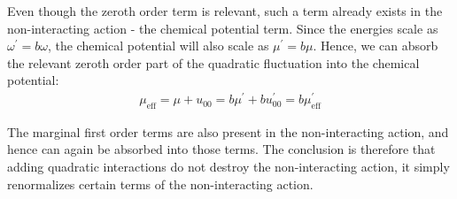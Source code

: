 \documentclass{article}
\begin{document}
Even though the zeroth order term is relevant,  such a term already exists in the non-interacting action - the chemical potential term. Since the energies scale as \(\omega^\prime = b\omega\), the chemical potential will also scale as \(\mu^\prime = b \mu\). Hence, we can absorb the relevant zeroth order part of the quadratic fluctuation into the chemical potential:
\begin{gather}
	\mu_\text{eff} = \mu + u_{00} = b \mu^\prime + bu^\prime_{00} = b \mu_\text{eff}^\prime
\end{gather}

The marginal first order terms are also present in the non-interacting action, and hence can again be absorbed into those terms. The conclusion is therefore that adding quadratic interactions do not destroy the non-interacting action, it simply renormalizes certain terms of the non-interacting action.
\end{document}
